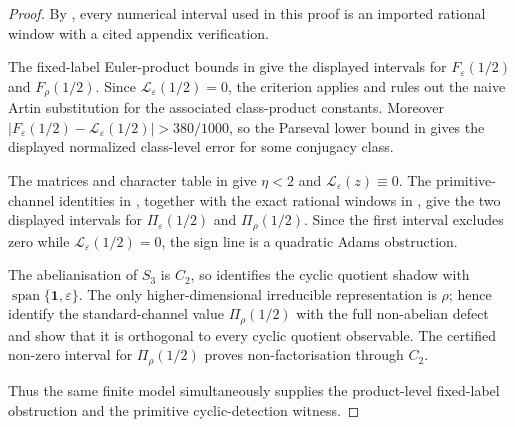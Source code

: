 \documentclass[11pt,a4paper]{amsart}
\theoremstyle{plain}
\theoremstyle{definition}
\theoremstyle{remark}
\begin{document}
\begin{proof}
  By , every numerical interval
  used in this proof is an imported rational window with a cited appendix
  verification.

  The fixed-label Euler-product bounds in
   give the displayed intervals
  for \(F_\varepsilon(1/2)\) and \(F_\rho(1/2)\).  Since
  \(\mathcal L_\varepsilon(1/2)=0\), the criterion
   applies and rules out the
  naive Artin substitution for the associated class-product constants.
  Moreover
  \(|F_\varepsilon(1/2)-\mathcal L_\varepsilon(1/2)|>380/1000\), so the
  Parseval lower bound in  gives the
  displayed normalized class-level error for some conjugacy class.

  The matrices and character table in
   give \(\eta<2\) and
  \(\mathcal L_\varepsilon(z)\equiv0\).  The primitive-channel identities
  in , together with the exact
  rational windows in , give the
  two displayed intervals for \(\Pi_\varepsilon(1/2)\) and
  \(\Pi_\rho(1/2)\).  Since the first interval excludes zero while
  \(\mathcal L_\varepsilon(1/2)=0\), the sign line is a quadratic Adams
  obstruction.

  The abelianisation of \(S_3\) is \(C_2\), so
   identifies the
  cyclic quotient shadow with
  \(\operatorname{span}\{\mathbf1,\varepsilon\}\).  The only
  higher-dimensional irreducible representation is \(\rho\); hence
   identify
  the standard-channel value \(\Pi_\rho(1/2)\) with the full
  non-abelian defect and show that it is orthogonal to every cyclic
  quotient observable.  The certified non-zero interval for
  \(\Pi_\rho(1/2)\) proves non-factorisation through \(C_2\).

  Thus the same finite model simultaneously supplies the product-level
  fixed-label obstruction and the primitive cyclic-detection witness.
\end{proof}
\end{document}
